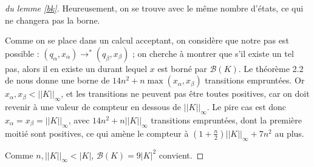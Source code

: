 \documentclass[12pt, a4paper]{article}
\newcommand{\Kinf}{||K||_{\infty}}
\begin{document}
\begin{proof}[du lemme \ref{bk}]
        
        Heureusement, on se trouve avec le même nombre d'états, ce qui ne changera pas la borne.

        Comme on se place dans un calcul acceptant, on considère que notre pas est possible : $(q_\alpha,x_\alpha) \rightarrow^* (q_\beta,x_\beta)$ ; on cherche à montrer que s'il existe un tel pas, alors il en existe un durant lequel $x$ est borné par $\mathcal{B}(K)$.
        Le théorème 2.2 de \cite{shortpathOCS} nous donne une borne de $14n^2 + n \max (x_\alpha,x_\beta)$ transitions empruntées. Or $x_\alpha,x_\beta < \Kinf$, et les transitions ne peuvent pas être toutes positives, car on doit revenir à une valeur de compteur en dessous de $\Kinf$. Le pire cas est donc $x_\alpha = x_\beta = \Kinf$, avec $14n^2+n\Kinf$ transitions empruntées, dont la première moitié sont positives, ce qui amène le compteur à $(1+\frac{n}{2})\Kinf + 7n^2$ au plus.
        
        Comme $n,\Kinf < |K|$, $\mathcal{B}(K) = 9|K|^2$ convient.
       
    \end{proof}
\end{document}
